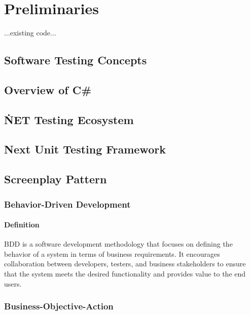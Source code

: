 \chapter{Preliminaries\label{chap:preliminaries}}

...existing code...

\section{Software Testing Concepts}


\section{Overview of C\#}


\section{\.NET Testing Ecosystem}


\section{Next Unit Testing Framework}


\section{Screenplay Pattern}


\subsection{Behavior-Driven Development}
\subsubsection{Definition}
\ac{BDD} is a software development methodology that focuses on defining the behavior of a system in terms of business requirements. It encourages collaboration between developers, testers, and business stakeholders to ensure that the system meets the desired functionality and provides value to the end users.

\subsection{Business-Objective-Action}
